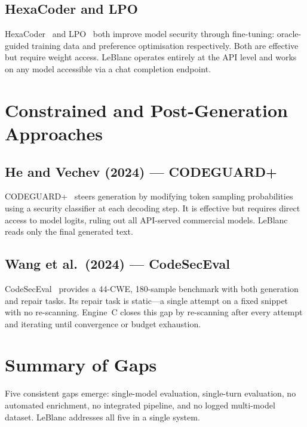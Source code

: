 \documentclass[12pt,a4paper]{report}
\begin{document}
\subsection{HexaCoder and LPO}

HexaCoder~\cite{hexacoder2024} and LPO~\cite{lpo2024} both improve model security
through fine-tuning: oracle-guided training data and preference optimisation
respectively. Both are effective but require weight access. LeBlanc operates
entirely at the API level and works on any model accessible via a chat completion
endpoint.

\section{Constrained and Post-Generation Approaches}
\label{sec:litpost}

\subsection{He and Vechev (2024) --- CODEGUARD+}

CODEGUARD+~\cite{codeguard2024} steers generation by modifying token sampling
probabilities using a security classifier at each decoding step. It is effective
but requires direct access to model logits, ruling out all API-served commercial
models. LeBlanc reads only the final generated text.

\subsection{Wang et al.\ (2024) --- CodeSecEval}

CodeSecEval~\cite{codeseceval2023} provides a 44-CWE, 180-sample benchmark with
both generation and repair tasks. Its repair task is static---a single attempt
on a fixed snippet with no re-scanning. Engine~C closes this gap by re-scanning
after every attempt and iterating until convergence or budget exhaustion.

\section{Summary of Gaps}
\label{sec:litgapsummary}

Five consistent gaps emerge: single-model evaluation, single-turn evaluation, no
automated enrichment, no integrated pipeline, and no logged multi-model dataset.
LeBlanc addresses all five in a single system.

\end{document}
